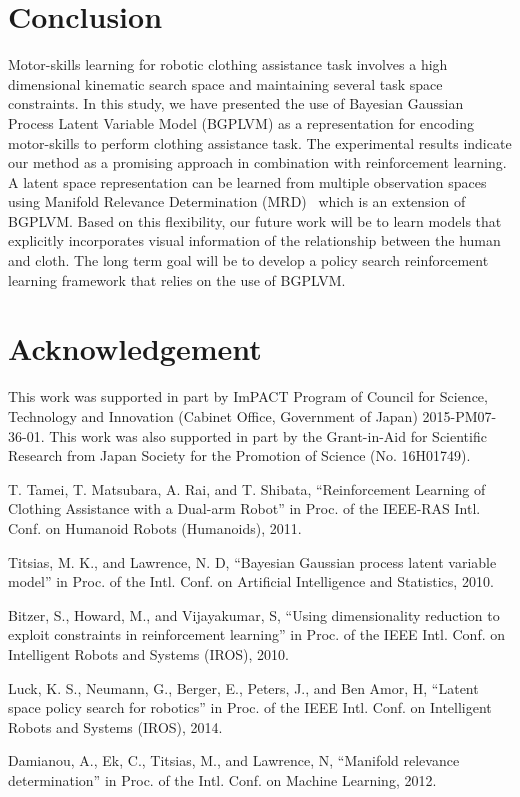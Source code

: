 \documentclass{article}
\begin{document}
\section{Conclusion}
\label{section:conclusion}

Motor-skills learning for robotic clothing assistance task involves a high dimensional kinematic search space and maintaining several task space constraints. In this study, we have presented the use of Bayesian Gaussian Process Latent Variable Model (BGPLVM) as a representation for encoding motor-skills to perform clothing assistance task. The experimental results indicate our method as a promising approach in combination with reinforcement learning. A latent space representation can be learned from multiple observation spaces using Manifold Relevance Determination (MRD)~\cite{mrd} which is an extension of BGPLVM. Based on this flexibility, our future work will be to learn models that explicitly incorporates visual information of the relationship between the human and cloth. The long term goal will be to develop a policy search reinforcement learning framework that relies on the use of BGPLVM.

\section*{Acknowledgement}
This work was supported in part by ImPACT Program of Council for Science, Technology and Innovation (Cabinet Office, Government of Japan) 2015-PM07-36-01. This work was also supported in part by the Grant-in-Aid for Scientific Research from Japan Society for the Promotion of Science (No. 16H01749).

\small

\begin{thebibliography}{15}
T. Tamei, T. Matsubara, A. Rai, and T. Shibata, ``Reinforcement Learning of Clothing Assistance with a Dual-arm Robot'' in Proc. of the IEEE-RAS Intl. Conf. on Humanoid Robots (Humanoids), 2011.

Titsias, M. K., and Lawrence, N. D, ``Bayesian Gaussian process latent variable model'' in Proc. of the Intl. Conf. on Artificial Intelligence and Statistics, 2010.

Bitzer, S., Howard, M., and Vijayakumar, S, ``Using dimensionality reduction to exploit constraints in reinforcement learning'' in Proc. of the IEEE Intl. Conf. on Intelligent Robots and Systems (IROS), 2010.

Luck, K. S., Neumann, G., Berger, E., Peters, J., and Ben Amor, H, ``Latent space policy search for robotics'' in Proc. of the IEEE Intl. Conf. on Intelligent Robots and Systems (IROS), 2014.

Damianou, A., Ek, C., Titsias, M., and Lawrence, N, ``Manifold relevance determination'' in Proc. of the Intl. Conf. on Machine Learning, 2012.

\end{thebibliography}
\end{document}
